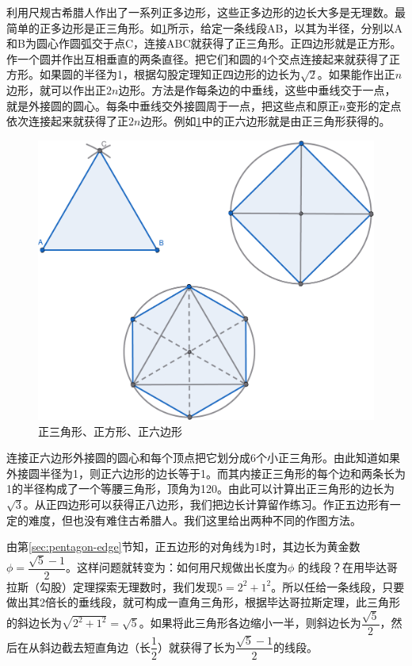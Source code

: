 \documentclass[b5paper]{ctexart}
\begin{document}
利用尺规古希腊人作出了一系列正多边形，这些正多边形的边长大多是无理数。最简单的正多边形是正三角形。如\cref{fig:polygon}所示，给定一条线段AB，以其为半径，分别以A和B为圆心作圆弧交于点C，连接ABC就获得了正三角形。正四边形就是正方形。作一个圆并作出互相垂直的两条直径。把它们和圆的4个交点连接起来就获得了正方形。如果圆的半径为1，根据勾股定理知正四边形的边长为$\sqrt{2}$。如果能作出正$n$边形，就可以作出正$2n$边形。方法是作每条边的中垂线，这些中垂线交于一点，就是外接圆的圆心。每条中垂线交外接圆周于一点，把这些点和原正$n$变形的定点依次连接起来就获得了正$2n$边形。例如\cref{fig:polygon}中的正六边形就是由正三角形获得的。

\begin{figure}[htbp]
 \centering
 \includegraphics[scale=0.35]{img/polygon}
 \caption{正三角形、正方形、正六边形}
 \label{fig:polygon}
\end{figure}

连接正六边形外接圆的圆心和每个顶点把它划分成6个小正三角形。由此知道如果外接圆半径为1，则正六边形的边长等于1。而其内接正三角形的每个边和两条长为1的半径构成了一个等腰三角形，顶角为120\degree。由此可以计算出正三角形的边长为$\sqrt{3}$。从正四边形可以获得正八边形，我们把边长计算留作练习。作正五边形有一定的难度，但也没有难住古希腊人。我们这里给出两种不同的作图方法。

由第\ref{sec:pentagon-edge}节知，正五边形的对角线为1时，其边长为黄金数$\phi = \dfrac{\sqrt{5}-1}{2}$。这样问题就转变为：如何用尺规做出长度为$\phi$ 的线段？在用毕达哥拉斯（勾股）定理探索无理数时，我们发现$5 = 2^2 + 1^2$。所以任给一条线段，只要做出其2倍长的垂线段，就可构成一直角三角形，根据毕达哥拉斯定理，此三角形的斜边长为$\sqrt{2^2 + 1^2} = \sqrt{5}$。如果将此三角形各边缩小一半，则斜边长为$\dfrac{\sqrt{5}}{2}$，然后在从斜边截去短直角边（长$\dfrac{1}{2}$）就获得了长为$\dfrac{\sqrt{5}-1}{2}$的线段。
\end{document}
